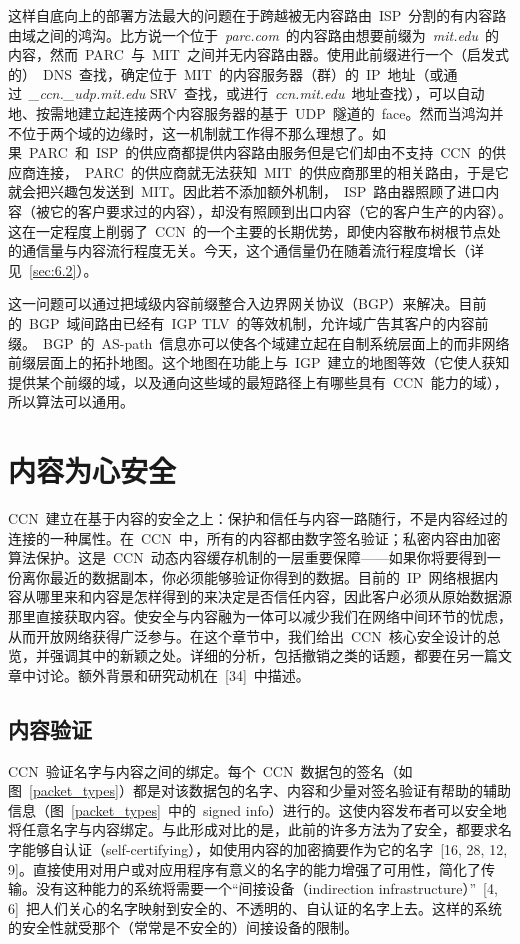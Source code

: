 这样自底向上的部署方法最大的问题在于跨越被无内容路由~ISP~分割的有内容路由域之间的鸿沟。比方说一个位于~\emph{parc.com}~的内容路由想要前缀为~\emph{mit.edu}~的内容，然而~PARC~与~MIT~之间并无内容路由器。使用此前缀进行一个（启发式的）~DNS~查找，确定位于~MIT~的内容服务器（群）的~IP~地址（或通过~\emph{\_ccn.\_udp.mit.edu} SRV~查找，或进行~\emph{ccn.mit.edu}~地址查找），可以自动地、按需地建立起连接两个内容服务器的基于~UDP~隧道的~face。然而当鸿沟并不位于两个域的边缘时，这一机制就工作得不那么理想了。如果~PARC~和~ISP~的供应商都提供内容路由服务但是它们却由不支持~CCN~的供应商连接，~PARC~的供应商就无法获知~MIT~的供应商那里的相关路由，于是它就会把兴趣包发送到~MIT。因此若不添加额外机制，~ISP~路由器照顾了进口内容（被它的客户要求过的内容），却没有照顾到出口内容（它的客户生产的内容）。这在一定程度上削弱了~CCN~的一个主要的长期优势，即使内容散布树根节点处的通信量与内容流行程度无关。今天，这个通信量仍在随着流行程度增长（详见~\ref{sec:6.2}）。

这一问题可以通过把域级内容前缀整合入边界网关协议（BGP）来解决。目前的~BGP~域间路由已经有~IGP TLV~的等效机制，允许域广告其客户的内容前缀。~BGP~的~AS-path~信息亦可以使各个域建立起在自制系统层面上的而非网络前缀层面上的拓扑地图。这个地图在功能上与~IGP~建立的地图等效（它使人获知提供某个前缀的域，以及通向这些域的最短路径上有哪些具有~CCN~能力的域），所以算法可以通用。


\section{内容为心安全}
\label{sec:5}
CCN~建立在基于内容的安全之上：保护和信任与内容一路随行，不是内容经过的连接的一种属性。在~CCN~中，所有的内容都由数字签名验证；私密内容由加密算法保护。这是~CCN~动态内容缓存机制的一层重要保障——如果你将要得到一份离你最近的数据副本，你必须能够验证你得到的数据。目前的~IP~网络根据内容从哪里来和内容是怎样得到的来决定是否信任内容，因此客户必须从原始数据源那里直接获取内容。使安全与内容融为一体可以减少我们在网络中间环节的忧虑，从而开放网络获得广泛参与。在这个章节中，我们给出~CCN~核心安全设计的总览，并强调其中的新颖之处。详细的分析，包括撤销之类的话题，都要在另一篇文章中讨论。额外背景和研究动机在~[34]~中描述。

\subsection{内容验证}
\label{sec:5.1}
CCN~验证名字与内容之间的绑定。每个~CCN~数据包的签名（如图~\ref{packet_types}）都是对该数据包的名字、内容和少量对签名验证有帮助的辅助信息（图~\ref{packet_types}~中的~signed info）进行的。这使内容发布者可以安全地将任意名字与内容绑定。与此形成对比的是，此前的许多方法为了安全，都要求名字能够自认证（self-certifying），如使用内容的加密摘要作为它的名字~[16, 28, 12, 9]。直接使用对用户或对应用程序有意义的名字的能力增强了可用性，简化了传输。没有这种能力的系统将需要一个“间接设备（indirection infrastructure）”~[4, 6]~把人们关心的名字映射到安全的、不透明的、自认证的名字上去。这样的系统的安全性就受那个（常常是不安全的）间接设备的限制。

